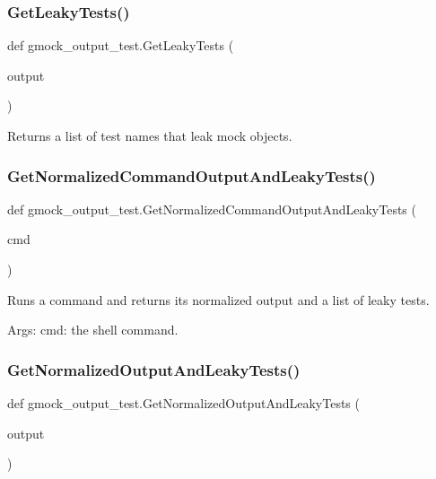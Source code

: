 \subsubsection{\texorpdfstring{Get\+Leaky\+Tests()}{GetLeakyTests()}}
{\footnotesize\ttfamily def gmock\+\_\+output\+\_\+test.\+Get\+Leaky\+Tests (\begin{DoxyParamCaption}\item[{}]{output }\end{DoxyParamCaption})}

\begin{DoxyVerb}Returns a list of test names that leak mock objects.\end{DoxyVerb}
 \mbox{\label{namespacegmock__output__test_a1796bc395fbfb8873992e3f84378e4bf}} 
\subsubsection{\texorpdfstring{Get\+Normalized\+Command\+Output\+And\+Leaky\+Tests()}{GetNormalizedCommandOutputAndLeakyTests()}}
{\footnotesize\ttfamily def gmock\+\_\+output\+\_\+test.\+Get\+Normalized\+Command\+Output\+And\+Leaky\+Tests (\begin{DoxyParamCaption}\item[{}]{cmd }\end{DoxyParamCaption})}

\begin{DoxyVerb}Runs a command and returns its normalized output and a list of leaky tests.

Args:
  cmd:  the shell command.
\end{DoxyVerb}
 \mbox{\label{namespacegmock__output__test_a590ba3b918e5599eeabc2cbf597e2ce1}} 
\subsubsection{\texorpdfstring{Get\+Normalized\+Output\+And\+Leaky\+Tests()}{GetNormalizedOutputAndLeakyTests()}}
{\footnotesize\ttfamily def gmock\+\_\+output\+\_\+test.\+Get\+Normalized\+Output\+And\+Leaky\+Tests (\begin{DoxyParamCaption}\item[{}]{output }\end{DoxyParamCaption})}


